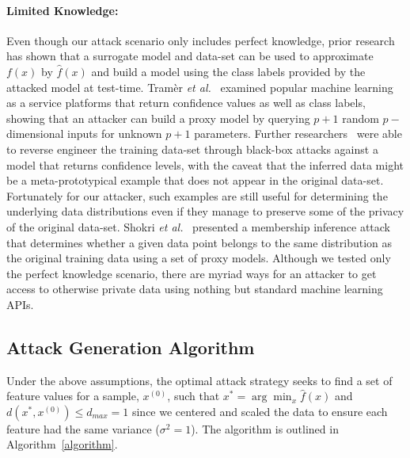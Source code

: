 \documentclass[fonts]{icst}
\begin{document}
\paragraph{Limited Knowledge: }
Even though our attack scenario only includes perfect knowledge, prior research~\cite{fredrikson2015model,biggio2013evasion,chakraborty2018adversarial,wang2019security,ateniese2015hacking} has shown that a surrogate model and data-set can be used to approximate $f(x)$ by $\hat{f}(x)$ and build a model using the class labels provided by the attacked model at test-time.
Tram\`er \textit{et al.}~\cite{tramer2016stealing} examined popular machine learning as a service platforms that return confidence values as well as class labels, showing that an attacker can build a proxy model by querying $ p + 1$ random $p-$dimensional inputs for unknown $p+1$ parameters.
Further researchers~\cite{fredrikson2015model} were able to reverse engineer the training data-set through black-box attacks against a model that returns confidence levels, with the caveat that the inferred data might be a meta-prototypical example that does not appear in the original data-set.
Fortunately for our attacker, such examples are still useful for determining the underlying data distributions even if they manage to preserve some of the privacy of the original data-set.
Shokri \textit{et al.}~\cite{shokri2017membership} presented a membership inference attack that determines whether a given data point belongs to the same distribution as the original training data using a set of proxy models.
Although we tested only the perfect knowledge scenario, there are myriad ways for an attacker to get access to otherwise private data using nothing but standard machine learning APIs.


\subsection{Attack Generation Algorithm}

Under the above assumptions, the optimal attack strategy seeks to find a set of feature values for a sample, $x^{(0)}$, such that
$x^* = \arg\min_{x}\hat{f}(x)$ and $d(x^*, x^{(0)}) \leq d_{max} = 1$ since we centered and scaled the data to ensure each feature had the same variance ($\sigma^2 = 1$).
The algorithm is outlined in Algorithm~\ref{algorithm}.
\end{document}
